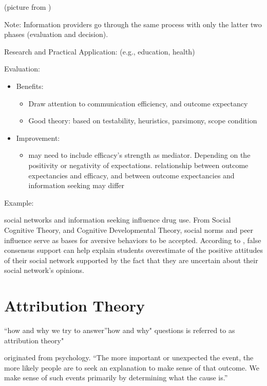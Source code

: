 \documentclass[
]{book}
\providecommand{\tightlist}{%
  \setlength{\itemsep}{0pt}\setlength{\parskip}{0pt}}
\begin{document}
(picture from \citep{Baxter_2008})

Note: Information providers go through the same process with only the latter two phases (evaluation and decision).

Research and Practical Application: (e.g., education, health)

Evaluation:

\begin{itemize}
\item
  Benefits:

  \begin{itemize}
  \tightlist
  \item
    Draw attention to communication efficiency, and outcome expectancy
  \item
    Good theory: based on testability, heuristics, parsimony, scope condition
  \end{itemize}
\item
  Improvement:

  \begin{itemize}
  \tightlist
  \item
    may need to include efficacy's strength as mediator. Depending on the positivity or negativity of expectations.
    relationship between outcome expectancies and efficacy, and between outcome expectancies and information seeking
    may differ
  \end{itemize}
\end{itemize}

Example:

\citep{Morse_2013} social networks and information seeking influence drug use. From Social Cognitive Theory, and Cognitive
Developmental Theory, social norms and peer influence serve as bases for aversive behaviors to be accepted. According to
\citep{Wolfson_2000}, false consensus support can help explain students overestimate of the positive attitudes of their
social network supported by the fact that they are uncertain about their social network's opinions.

\hypertarget{attribution-theory}{%
\section{Attribution Theory}\label{attribution-theory}}

``how and why we try to answer''how and why" questions is referred to as attribution theory" \citep{Baxter_2008}

originated from psychology. ``The more important or unexpected the event, the more likely people are to seek an
explanation to make sense of that outcome. We make sense of such events primarily by determining what the cause is.''
\end{document}
